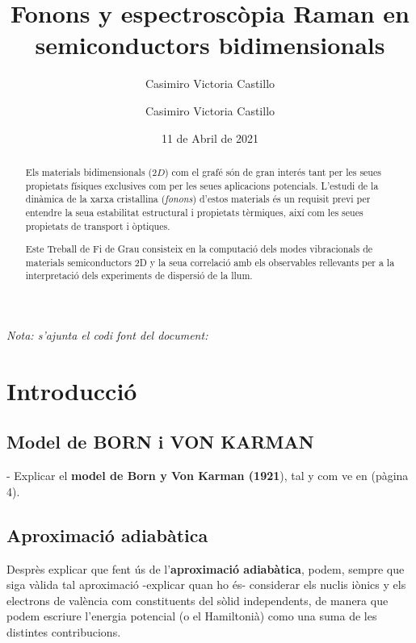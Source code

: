 \documentclass[12pt,twoside,a4paper]{article}%
\author{Casimiro Victoria Castillo}
\begin{document}
\title{Fonons y espectroscòpia Raman en semiconductors bidimensionals}
\author{Casimiro Victoria Castillo}
\date{11 de Abril de 2021}
\maketitle



\begin{abstract}
  Els materials bidimensionals ($2D$) com el grafé són de gran interés tant per les seues propietats físiques exclusives com per les seues aplicacions potencials. L'estudi de la dinàmica de la xarxa cristallina (\textit{fonons}) d'estos materials és un requisit previ per entendre la seua estabilitat estructural i propietats tèrmiques, així com les seues propietats de transport i òptiques.   


  Este Treball de Fi de Grau consisteix en la computació dels modes vibracionals de materials semiconductors 2D y la seua correlació amb els observables rellevants per a la interpretació dels experiments de dispersió de la llum.
\end{abstract}

\textit{Nota: s'ajunta el codi font del document: }

\newpage

\section{Introducció}


\subsection{Model de BORN i VON KARMAN}
- Explicar el \textbf{model de  Born y  Von Karman (1921}), tal y com ve en \cite{Balkanski_2000} \cite{brueesch82_phonon} (pàgina 4).


\subsection{Aproximació adiabàtica}
Desprès explicar que fent ús de l'\textbf{aproximació adiabàtica}, podem, sempre que siga vàlida tal aproximació -explicar quan ho és- considerar els nuclis iònics y els electrons de valència com constituents del sòlid independents, de manera que podem escriure l'energia potencial (o el Hamiltonià) como una suma de les distintes contribucions.
  
\end{document}
